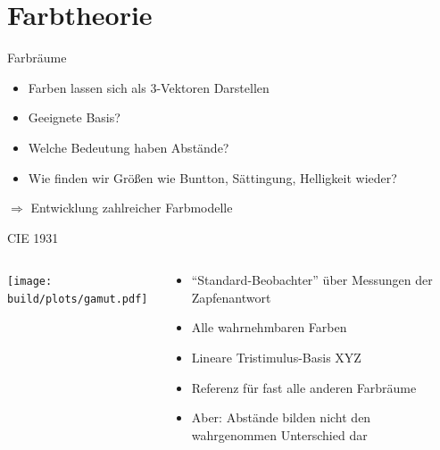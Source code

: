\documentclass[aspectratio=1610, 9pt]{beamer}
\begin{document}
\section{Farbtheorie}

\begin{frame}{Farbräume}
  \begin{itemize}
    \item Farben lassen sich als 3-Vektoren Darstellen
    \item Geeignete Basis?
    \item Welche Bedeutung haben Abstände?
    \item Wie finden wir Größen wie Buntton, Sättingung, Helligkeit wieder?
  \end{itemize}

  \Large $⇒{}$ Entwicklung zahlreicher Farbmodelle
\end{frame}%

\begin{frame}{CIE 1931}
  \begin{columns}[onlytextwidth]%
    \begin{column}{0.495\textwidth}%
      \texttt{[image: build/plots/gamut.pdf]}
    \end{column}%
    \begin{column}{0.495\textwidth}%
      \begin{itemize}
        \item \enquote{Standard-Beobachter} über Messungen der Zapfenantwort
        \item Alle wahrnehmbaren Farben
        \item Lineare Tristimulus-Basis XYZ
        \item Referenz für fast alle anderen Farbräume
        \item Aber: Abstände bilden nicht den wahrgenommen Unterschied dar
      \end{itemize}
    \end{column}%
  \end{columns}%
\end{frame}
\end{document}

